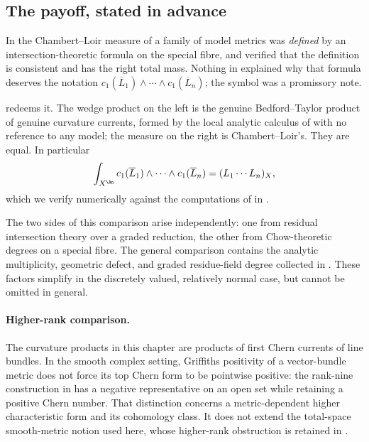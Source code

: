 \subsection{The payoff, stated in advance}
\label{sec:ch17-payoff}

In  the Chambert--Loir measure of a family of
model metrics was \emph{defined} by an intersection-theoretic formula on the
special fibre, and  verified that the
definition is consistent and has the right total mass.  Nothing in
 explained why that formula deserves the notation
$c_1(\overline L_1)\wedge\cdots\wedge c_1(\overline L_n)$; the symbol was
a promissory note.

 redeems it.  The wedge product on the left is the
genuine Bedford--Taylor product of genuine curvature currents, formed by the
local analytic calculus of
 with no reference to any
model; the measure on the right is Chambert--Loir's.  They are equal.  In
particular
\[
 \int_{X^{\An}}c_1(\overline L_1)\wedge\cdots\wedge c_1(\overline L_n)
 =(L_1\cdots L_n)_X,
\]
which we verify numerically against the computations of
 in .

The two sides of this comparison arise independently: one from residual
intersection theory over a graded reduction, the other from Chow-theoretic
degrees on a special fibre.  The general comparison contains the analytic
multiplicity, geometric defect, and graded residue-field degree collected in
.  These factors simplify in the discretely valued,
relatively normal case, but cannot be omitted in general.


\paragraph{Higher-rank comparison.}
The curvature products in this chapter are products of first Chern
currents of line bundles. In the smooth complex setting, Griffiths
positivity of a vector-bundle metric does not force its top Chern
form to be pointwise positive: the rank-nine construction in
 has a negative representative on an
open set while retaining a positive Chern number. That distinction
concerns a metric-dependent higher characteristic form and its
cohomology class. It does not extend the total-space smooth-metric
notion used here, whose higher-rank obstruction is retained in
.

